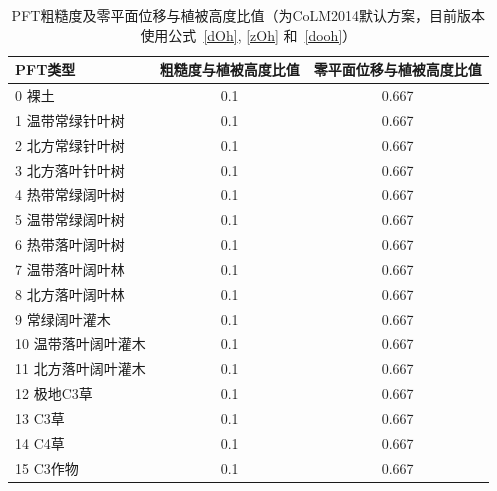\begin{table}[htbp]
    \centering
    \caption[PFT粗糙度及零平面位移与植被高度比值]{PFT粗糙度及零平面位移与植被高度比值（为CoLM2014默认方案，目前版本使用公式~\eqref{dOh}, \eqref{zOh} 和~\eqref{dooh}）}
    \label{tab:PFT粗糙度及零平面位移与植被高度比值}
    \begin{tabular}{@{}lcc@{}}
    \toprule
    PFT类型       & 粗糙度与植被高度比值 & 零平面位移与植被高度比值 \\ \midrule
    0 裸土        & 0.1        & 0.667        \\
    1 温带常绿针叶树   & 0.1        & 0.667        \\
    2 北方常绿针叶树   & 0.1        & 0.667        \\
    3 北方落叶针叶树   & 0.1        & 0.667        \\
    4 热带常绿阔叶树   & 0.1        & 0.667        \\
    5 温带常绿阔叶树   & 0.1        & 0.667        \\
    6 热带落叶阔叶树   & 0.1        & 0.667        \\
    7 温带落叶阔叶林   & 0.1        & 0.667        \\
    8 北方落叶阔叶林   & 0.1        & 0.667        \\
    9 常绿阔叶灌木    & 0.1        & 0.667        \\
    10 温带落叶阔叶灌木 & 0.1        & 0.667        \\
    11 北方落叶阔叶灌木 & 0.1        & 0.667        \\
    12 极地C3草    & 0.1        & 0.667        \\
    13 C3草      & 0.1        & 0.667        \\
    14 C4草      & 0.1        & 0.667        \\
    15 C3作物     & 0.1        & 0.667        \\ \bottomrule
    \end{tabular}
\end{table}



